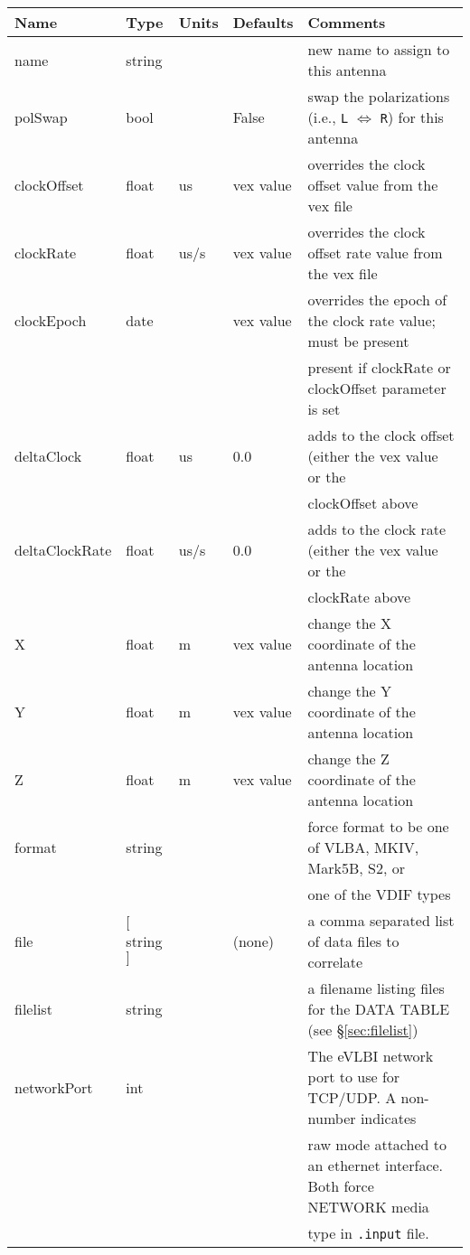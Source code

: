 \begin{center}
\begin{tabular}{l l l l l}
\hline
Name		& Type		& Units 	& Defaults	& Comments \\
\hline
name		& string	&       	&		& new name to assign to this antenna \\
polSwap		& bool		&       	& False		& swap the polarizations (i.e., {\tt L} $\Leftrightarrow$ {\tt R}) for this antenna \\
clockOffset	& float		& us		& vex value	& overrides the clock offset value from the vex file \\
clockRate	& float		& us/s		& vex value	& overrides the clock offset rate value from the vex file \\
clockEpoch	& date		&		& vex value	& overrides the epoch of the clock rate value; must be present \\
		&		&		&		& present if clockRate or clockOffset parameter is set \\
deltaClock	& float		& us		& 0.0		& adds to the clock offset (either the vex value or the \\
		&		&		&		& clockOffset above  \\
deltaClockRate	& float		& us/s		& 0.0		& adds to the clock rate (either the vex value or the \\
		&		&		&		& clockRate above \\
X		& float		& m		& vex value	& change the X coordinate of the antenna location \\
Y		& float		& m		& vex value	& change the Y coordinate of the antenna location \\
Z		& float		& m		& vex value	& change the Z coordinate of the antenna location \\
format		& string	&		&		& force format to be one of VLBA, MKIV, Mark5B, S2, or \\
		&		&		&		& one of the VDIF types \\
file		& $[$string$]$	&		& (none)	& a comma separated list of data files to correlate \\
filelist	& string	&		&		& a filename listing files for the DATA TABLE (see \S\ref{sec:filelist}) \\
networkPort	& int		&		&		& The eVLBI network port to use for TCP/UDP. A non-number indicates \\
		&		&		&		& raw mode attached to an ethernet interface. Both force NETWORK media \\
		&		&		&		& type in {\tt .input} file. \\

\end{tabular}
\end{center}

